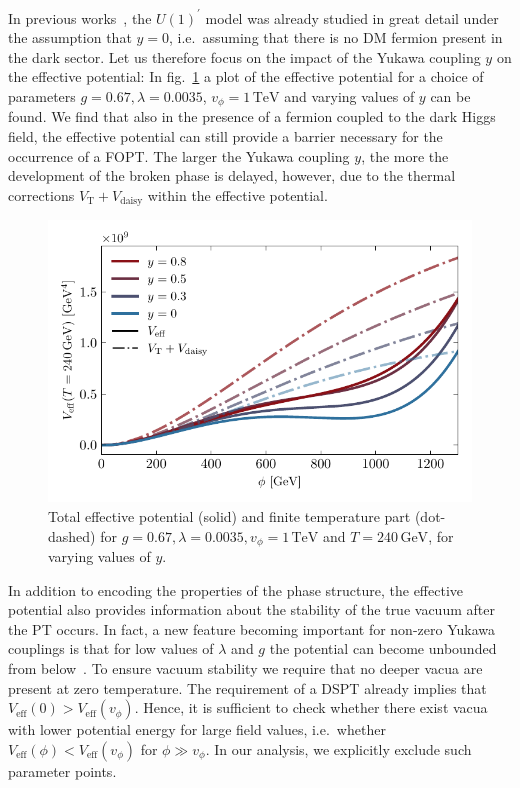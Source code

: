 In previous works~\cite{Breitbach:2018ddu, Ertas:2021xeh}, the $U(1)^\prime$  model was already studied in great detail under the assumption that $y = 0$, i.e.~assuming that there is no \ac{DM} fermion present in the dark sector. Let us therefore focus on the impact of the Yukawa coupling $y$ on the effective potential: In fig.~\ref{fig:potential} a plot of the effective potential for a choice of parameters $g=0.67, \lambda=0.0035$, $v_\phi = 1 \, \text{TeV}$ and varying values of $y$ can be found. We find that also in the presence of a fermion coupled to the dark Higgs field, the effective potential can still provide a barrier necessary for the occurrence of a \ac{FOPT}. The larger the Yukawa coupling $y$, the more the development of the broken phase is delayed, however, due to the thermal corrections $V_\text{T} + V_\text{daisy}$ within the effective potential.

\begin{figure}[t]
	\centering
	\includegraphics[width=\textwidth]{thesisplots/lisa/thesis_LISA_1.pdf}
	\caption{Total effective potential (solid) and finite temperature part (dot-dashed)
		for $g=0.67, \lambda=0.0035, v_{\phi} = 1\,\text{TeV}$ and $T = 240\,\text{GeV}$, for varying
		values of $y$.}
	\label{fig:potential}
\end{figure}

In addition to encoding the properties of the phase structure, the effective potential also provides information about the stability of the true vacuum after the \ac{PT} occurs. In fact, a new feature becoming important for non-zero Yukawa couplings is that for low values of $\lambda$ and $g$ the potential can become unbounded from below~\cite{Weinberg:1976pe}. To ensure vacuum stability we require that no deeper vacua are present at zero temperature.  The requirement of a \ac{DSPT} already implies that $V_\text{eff}(0) > V_\text{eff}(v_\phi)$. Hence, it is sufficient to check whether there exist vacua with lower potential energy for large field values, i.e.~whether $V_\mathrm{eff}(\phi) < V_\mathrm{eff}(v_\phi)$ for $\phi \gg v_\phi$. In our analysis, we explicitly exclude such parameter points.

